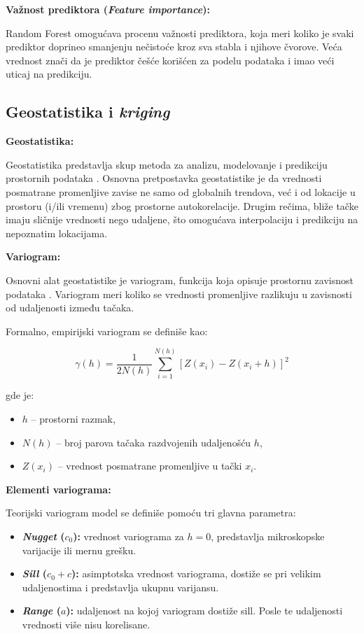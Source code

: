 \documentclass[12pt]{article}
\begin{document}
\textbf{Važnost prediktora (\textit{Feature importance}):}

Random Forest omogućava procenu važnosti prediktora, koja meri koliko je svaki prediktor doprineo smanjenju nečistoće kroz sva stabla i njihove čvorove. Veća vrednost znači da je prediktor češće korišćen za podelu podataka i imao veći uticaj na predikciju.

\subsection{Geostatistika i \textit{kriging}}

\textbf{Geostatistika:}

Geostatistika predstavlja skup metoda za analizu, modelovanje i predikciju prostornih podataka \cite{cressie1993statistics, isaaks1989applied}. Osnovna pretpostavka geostatistike je da vrednosti posmatrane promenljive zavise ne samo od globalnih trendova, već i od lokacije u prostoru (i/ili vremenu) zbog prostorne autokorelacije. Drugim rečima, bliže tačke imaju sličnije vrednosti nego udaljene, što omogućava interpolaciju i predikciju na nepoznatim lokacijama.

\textbf{Variogram:}

Osnovni alat geostatistike je variogram, funkcija koja opisuje prostornu zavisnost podataka \cite{chiles2012geostatistics}. Variogram meri koliko se vrednosti promenljive razlikuju u zavisnosti od udaljenosti između tačaka.

Formalno, empirijski variogram se definiše kao:

\begin{equation}
\gamma(h) = \frac{1}{2N(h)} \sum_{i=1}^{N(h)} [Z(x_i) - Z(x_i + h)]^2
\end{equation}

gde je:
\begin{itemize}
    \item $h$ -- prostorni razmak,
    \item $N(h)$ -- broj parova tačaka razdvojenih udaljenošću $h$,
    \item $Z(x_i)$ -- vrednost posmatrane promenljive u tački $x_i$.
\end{itemize}

\textbf{Elementi variograma:}

Teorijski variogram model se definiše pomoću tri glavna parametra:

\begin{itemize}
    \item \textbf{\textit{Nugget} ($c_0$):} vrednost variograma za $h=0$, predstavlja mikroskopske varijacije ili mernu grešku.
    \item \textbf{\textit{Sill} ($c_0 + c$):} asimptotska vrednost variograma, dostiže se pri velikim udaljenostima i predstavlja ukupnu varijansu.
    \item \textbf{\textit{Range} ($a$):} udaljenost na kojoj variogram dostiže sill. Posle te udaljenosti vrednosti više nisu korelisane.
\end{itemize}
\end{document}
